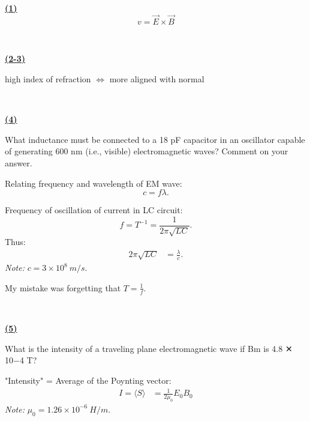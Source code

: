 \documentclass{article}
\begin{document}

\textbf{\underline{(1)}}
\begin{equation*}
v=\vec{E} \times \vec{B}
\end{equation*}

\

\hline

\textbf{\underline{(2-3)}}

high index of refraction $\Longleftrightarrow $ more aligned with normal

\

\hline

\textbf{\underline{(4)}}

\begin{example}

What inductance must be connected to a 18 pF capacitor in an oscillator capable of generating 600 nm (i.e., visible) electromagnetic waves? Comment on your answer.

\end{example}



Relating frequency and wavelength of EM wave:
\begin{equation*}
\boxed{c=f\lambda } .
\end{equation*}


Frequency of oscillation of current in LC circuit:
\begin{equation*}
\boxed{f=T^{-1} =\frac{1}{2\pi \sqrt{LC}}} .
\end{equation*}
Thus:
\begin{align*}
2\pi \sqrt{LC} & =\frac{\lambda }{c} .
\end{align*}
\textit{Note: }$c=3\times 10^{8} \ m/s$.



My mistake was forgetting that $T=\frac{1}{f}$.


\


\hline

\textbf{\underline{(5)}}

\begin{example}

What is the intensity of a traveling plane electromagnetic wave if Bm is 4.8 ✕ 10−4 T?

\end{example}



"Intensity" = Average of the Poynting vector:
\begin{align*}
I=\langle S\rangle  & =\frac{1}{2\mu _{0}} E_{0} B_{0}
\end{align*}
\textit{Note: }$\mu _{0} =1.26\times 10^{-6} \ H/m$.
\end{document}
